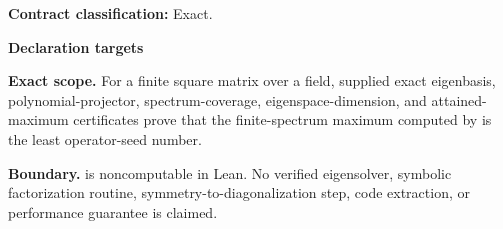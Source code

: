 \label{row:35}
\textbf{Contract classification:} Exact.
\par\smallskip\textbf{Declaration targets}\par
{\small\noindent{}\par}
{\small\noindent{}\par}
\medskip\noindent\textbf{Exact scope.} For a finite square matrix over a field, supplied exact eigenbasis, polynomial-projector, spectrum-coverage, eigenspace-dimension, and attained-maximum certificates prove that the finite-spectrum maximum computed by  is the least operator-seed number.
\par\smallskip\noindent\textbf{Boundary.}  is noncomputable in Lean. No verified eigensolver, symbolic factorization routine, symmetry-to-diagonalization step, code extraction, or performance guarantee is claimed.
\medskip
